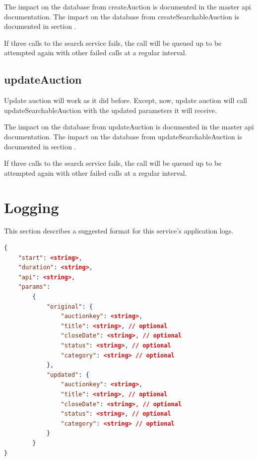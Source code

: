 \documentclass[12pt,a4paper]{article}
\begin{document}
The impact on the database from createAuction is documented in the master api
documentation. The impact on the database from createSearchableAuction is
documented in section .

If three calls to the search service fails, the call will be queued up to be
attempted again with other failed calls at a regular interval.


\subsection{updateAuction}

Update auction will work as it did before. Except, now, update auction will
call updateSearchableAuction with the updated parameters it will receive.

The impact on the database from updateAuction is documented in the master api
documentation. The impact on the database from updateSearchableAuction is
documented in section .

If three calls to the search service fails, the call will be queued up to be
attempted again with other failed calls at a regular interval.

\pagebreak
\section{Logging}

This section describes a suggested format for this service's application logs.

\begin{lstlisting}[boxpos=t,language=json,firstnumber=1]
{
    "start": <string>,
    "duration": <string>,
    "api": <string>,
    "params":
        {
            "original": {
                "auctionkey": <string>,
                "title": <string>, // optional
                "closeDate": <string>, // optional
                "status": <string>, // optional
                "category": <string> // optional 
            }, 
            "updated": {
                "auctionkey": <string>,
                "title": <string>, // optional
                "closeDate": <string>, // optional
                "status": <string>, // optional
                "category": <string> // optional 
            }
        }
}           
\end{lstlisting}
\end{document}
